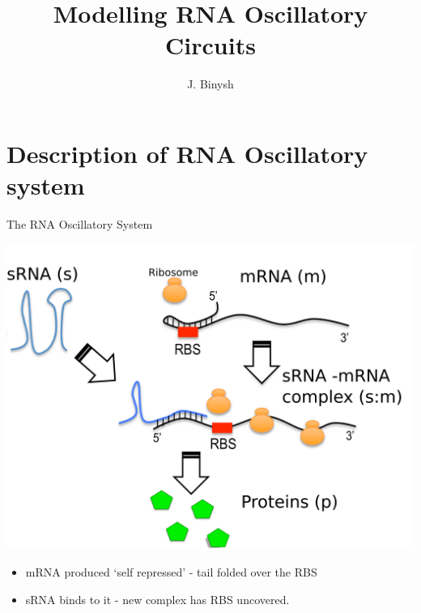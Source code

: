 \documentclass{beamer}
\title %
{Modelling RNA Oscillatory Circuits}
\subtitle
{}
\author %
{J. Binysh\inst{1}}
\institute[University of Warwick] %
{
  \inst{1}%
 	Centre for Complexity Science\\
  University of Warwick
 }
\begin{document}
\begin{frame}
  \titlepage
\end{frame}





\section{Description of RNA Oscillatory system}

\begin{frame}{The RNA Oscillatory System}{}
  \begin{center}
  \includegraphics[trim = 0 0 0 30,clip = true,scale = 0.275]{Figures/schematic_initial.png}
  \end{center}

  \begin{itemize}
    \item  mRNA produced `self repressed'  - tail folded over the RBS
    \item  sRNA binds to it - new complex has RBS uncovered.
    \end{itemize}
\end{frame}
\end{document}
